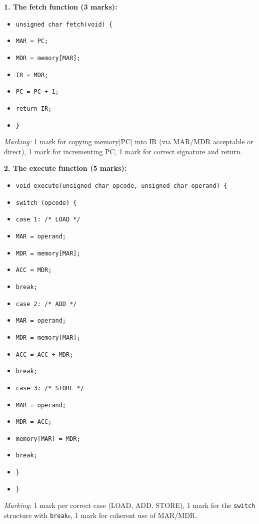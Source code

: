 \documentclass[11pt]{article}
\begin{document}
\begin{corrige}
\textbf{1. The fetch function (3 marks):}
\begin{itemize}
\item[] \texttt{unsigned char fetch(void) \{}
\item[] \texttt{\quad MAR = PC;}
\item[] \texttt{\quad MDR = memory[MAR];}
\item[] \texttt{\quad IR = MDR;}
\item[] \texttt{\quad PC = PC + 1;}
\item[] \texttt{\quad return IR;}
\item[] \texttt{\}}
\end{itemize}
\emph{Marking:} 1 mark for copying memory[PC] into IR (via MAR/MDR acceptable or direct), 1 mark for incrementing PC, 1 mark for correct signature and return.

\textbf{2. The execute function (5 marks):}
\begin{itemize}
\item[] \texttt{void execute(unsigned char opcode, unsigned char operand) \{}
\item[] \texttt{\quad switch (opcode) \{}
\item[] \texttt{\quad\quad case 1: /* LOAD */}
\item[] \texttt{\quad\quad\quad MAR = operand;}
\item[] \texttt{\quad\quad\quad MDR = memory[MAR];}
\item[] \texttt{\quad\quad\quad ACC = MDR;}
\item[] \texttt{\quad\quad\quad break;}
\item[] \texttt{\quad\quad case 2: /* ADD */}
\item[] \texttt{\quad\quad\quad MAR = operand;}
\item[] \texttt{\quad\quad\quad MDR = memory[MAR];}
\item[] \texttt{\quad\quad\quad ACC = ACC + MDR;}
\item[] \texttt{\quad\quad\quad break;}
\item[] \texttt{\quad\quad case 3: /* STORE */}
\item[] \texttt{\quad\quad\quad MAR = operand;}
\item[] \texttt{\quad\quad\quad MDR = ACC;}
\item[] \texttt{\quad\quad\quad memory[MAR] = MDR;}
\item[] \texttt{\quad\quad\quad break;}
\item[] \texttt{\quad\}}
\item[] \texttt{\}}
\end{itemize}
\emph{Marking:} 1 mark per correct case (LOAD, ADD, STORE), 1 mark for the \texttt{switch} structure with \texttt{break}s, 1 mark for coherent use of MAR/MDR.


\end{corrige}
\end{document}
